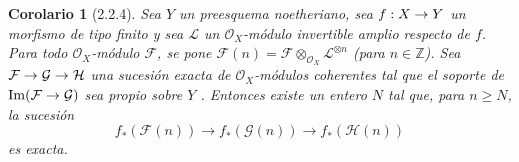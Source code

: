 \documentclass[10pt,oneside,openany]{book}
\theoremstyle{egaenv}\newtheorem*{env}{---}
\theoremstyle{egastatement}
\newtheorem*{corollary}{Corolario}
\theoremstyle{egadescription}
\newcommand{\oldpage}[2][]{\marginnote{\normalfont\scriptsize\textbf{#1}\,|\,#2}\ignorespaces}
\renewcommand{\geq}{\geqslant}
\renewcommand{\to}{\mathchoice{\longrightarrow}{\rightarrow}{\rightarrow}{\rightarrow}}
\begin{document}
\oldpage[III]{102}

\begin{corollary}[2.2.4]
\label{III.2.2.4}
\label{III.2.2.4-fr}
Sea $Y$ un preesquema noetheriano, sea $f:X\to Y$ un morfismo de tipo finito y sea $\mathcal L$ un $\mathcal O_X$-módulo invertible amplio respecto de $f$.
Para todo $\mathcal O_X$-módulo $\mathcal F$, se pone
$\mathcal F(n)=\mathcal F\otimes_{\mathcal O_X}\mathcal L^{\otimes n}$
(para $n\in\mathbb Z$). Sea
$\mathcal F\to\mathcal G\to\mathcal H$
una sucesión exacta de $\mathcal O_X$-módulos coherentes tal que el soporte de $\operatorname{Im}(\mathcal F\to\mathcal G)$ sea propio sobre $Y$ \textup{}.
Entonces existe un entero $N$ tal que, para $n\geq N$, la sucesión
\[
f_*(\mathcal F(n))\longrightarrow f_*(\mathcal G(n))
\longrightarrow f_*(\mathcal H(n))
\]
es exacta.
\end{corollary}
\end{document}
